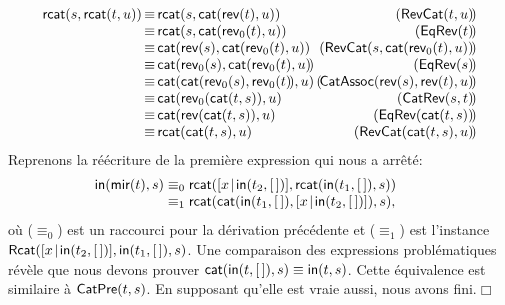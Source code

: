 \begin{equation*}
\begin{array}{@{}r@{\,}c@{\,}l@{\,}r@{}}
\fun{rcat}(s,\fun{rcat}(t,u))
& \equiv & \fun{rcat}(s,\fun{cat}(\fun{rev}(t),u))
& (\pred{RevCat}{t,u}\!)\\
& \equiv & \fun{rcat}(s,\fun{cat}(\fun{rev}_0(t),u))
& (\pred{EqRev}{t}\!)\\
& \equiv & \fun{cat}(\fun{rev}(s),\fun{cat}(\fun{rev}_0(t),u))
& (\pred{RevCat}{s,\fun{cat}(\fun{rev}_0(t),u)}\!)\\
& \equiv & \fun{cat}(\fun{rev}_0(s),\fun{cat}(\fun{rev}_0(t),u)\!)
& (\pred{EqRev}{s}\!)\\
& \equiv & \fun{cat}(\fun{cat}(\fun{rev}_0(s),\fun{rev}_0(t)\!),u)\!\!
& (\!\pred{CatAssoc}{\fun{rev}(s),\fun{rev}(t),u}\!)\\
& \equiv & \fun{cat}(\fun{rev}_0(\fun{cat}(t,s)),u)
& (\pred{CatRev}{s,t}\!)\\
& \equiv & \fun{cat}(\fun{rev}(\fun{cat}(t,s)),u)
& (\pred{EqRev}{\fun{cat}(t,s)}\!)\\
& \equiv & \fun{rcat}(\fun{cat}(t,s),u)
& (\pred{RevCat}{\fun{cat}(t,s),u}\!)
\end{array}
\end{equation*}
Reprenons la réécriture de la première expression qui nous a arrêté:
\begin{equation*}
\begin{array}{@{}r@{\;}c@{\;}l@{\qquad}r@{}}
\fun{in}(\fun{mir}(t),s)
& \equiv_0
& \fun{rcat}(\cons{x}{\fun{in}(t_2,\el)},
  \fun{rcat}(\fun{in}(t_1,\el),s))\\
& \equiv_1
& \fun{rcat}(\fun{cat}(\fun{in}(t_1,\el),
  \cons{x}{\fun{in}(t_2,\el)}), s),\index{rcat@\fun{rcat/2}|)}
\end{array}
\end{equation*}
où (\(\equiv_0\)) est un raccourci pour la dérivation précédente et
(\(\equiv_1\)) est l'instance
\(\textsf{Rcat}({[{x}\!\mid\!{\textsf{in}(t_2,[\,])}], \textsf{in}(t_1,[\,]),
  s})\). Une comparaison des expressions problématiques révèle que nous
devons prouver \(\textsf{cat}(\textsf{in}(t,[\,]),s) \equiv
\textsf{in}(t,s)\). Cette équivalence est similaire à
\(\textsf{CatPre}({t,s})\). En supposant
qu'elle est vraie aussi, nous avons fini.\hfill\(\Box\)

